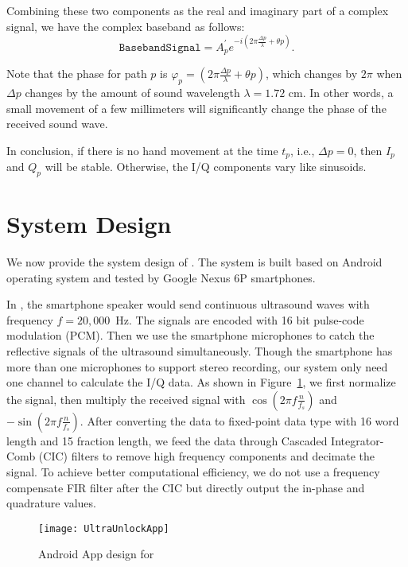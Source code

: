 Combining these two components as the real and imaginary part of a complex signal, we have the complex baseband as follows: 
\begin{displaymath}
\texttt{BasebandSignal} = A^\prime_p e^{-i \left(2 \pi \frac{\Delta p}{\lambda} + \theta p\right)}.
\end{displaymath}

Note that the phase for path $p$ is $\varphi_p = \left(2 \pi \frac{\Delta p}{\lambda} + \theta p\right)$, which changes by $2\pi$ when $\Delta p$ changes by the amount of sound wavelength $\lambda = 1.72 \text{~cm}$. In other words, a small
movement of a few millimeters will significantly change the phase of the received sound wave. 

In conclusion, if there is no hand movement at the time $t_p$, i.e., $\Delta p = 0$,  then $I_p$ and $Q_p$ will be stable. Otherwise, the I/Q components vary like sinusoids.


\section{System Design}
We now provide the system design of {\uu}. The system is built based on Android operating system and tested by Google Nexus 6P smartphones.

In {\uu}, the smartphone speaker would send continuous ultrasound waves with frequency $f = 20,000 $~Hz. The signals are encoded with 16 bit pulse-code modulation (PCM). Then we use the smartphone microphones to catch the reflective signals of the ultrasound simultaneously. Though the smartphone has more than one microphones to support stereo recording, our system only need one channel to calculate the I/Q data.  As shown in Figure~\ref{fig:ultraunlockapp}, we first normalize the signal, then multiply the received signal with $\cos \left (2\pi f \frac{n}{f_s}\right)$ and $-\sin \left (2\pi f \frac{n}{f_s}\right)$. After converting the data to fixed-point data type with 16 word length and 15 fraction length, we feed the data through Cascaded Integrator-Comb (CIC) filters to remove high frequency components and decimate the signal. To achieve better computational efficiency, we do not use a frequency compensate FIR filter after the CIC but directly output the in-phase and quadrature values.



\begin{landscape}
	\begin{figure}[h]
		\centering
		\vspace{-1.7in}
		\texttt{[image: UltraUnlockApp]}
		\vspace{-1.5in}
		\caption{Android App design for {\uu}}
		\label{fig:ultraunlockapp}
	\end{figure}
\end{landscape}



